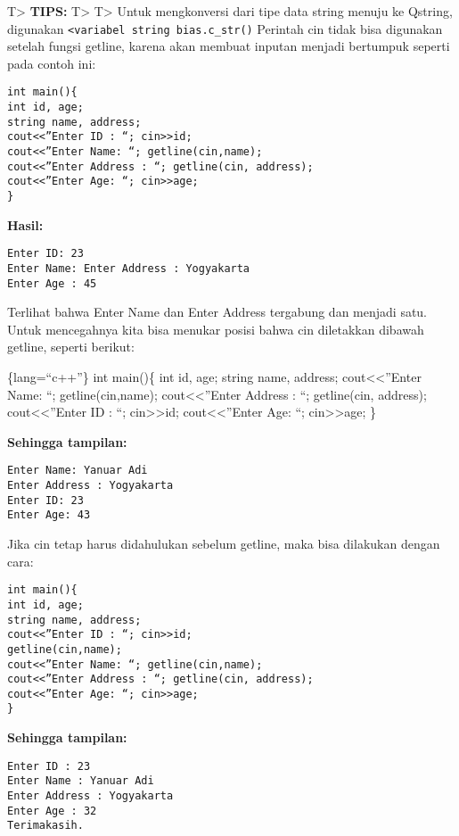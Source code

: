 T\textgreater{} \textbf{TIPS:} T\textgreater{} T\textgreater{} Untuk
mengkonversi dari tipe data string menuju ke Qstring, digunakan
\texttt{\textless{}variabel\ string\ bias.c\_str()} Perintah cin tidak
bisa digunakan setelah fungsi getline, karena akan membuat inputan
menjadi bertumpuk seperti pada contoh ini:

\begin{verbatim}
int main(){
int id, age;
string name, address;
cout<<”Enter ID : “; cin>>id;
cout<<”Enter Name: “; getline(cin,name);
cout<<”Enter Address : “; getline(cin, address);
cout<<”Enter Age: “; cin>>age;
}
\end{verbatim}

\textbf{Hasil:}

\begin{verbatim}
Enter ID: 23
Enter Name: Enter Address : Yogyakarta
Enter Age : 45
\end{verbatim}

Terlihat bahwa Enter Name dan Enter Address tergabung dan menjadi satu.
Untuk mencegahnya kita bisa menukar posisi bahwa cin diletakkan dibawah
getline, seperti berikut:

\{lang=``c++''\} int main()\{ int id, age; string name, address;
cout\textless{}\textless{}''Enter Name: ``; getline(cin,name);
cout\textless{}\textless{}''Enter Address : ``; getline(cin, address);
cout\textless{}\textless{}''Enter ID : ``;
cin\textgreater{}\textgreater{}id; cout\textless{}\textless{}''Enter
Age: ``; cin\textgreater{}\textgreater{}age; \}

\textbf{Sehingga tampilan:}

\begin{verbatim}
Enter Name: Yanuar Adi
Enter Address : Yogyakarta
Enter ID: 23
Enter Age: 43
\end{verbatim}

Jika cin tetap harus didahulukan sebelum getline, maka bisa dilakukan
dengan cara:

\begin{verbatim}
int main(){
int id, age;
string name, address;
cout<<”Enter ID : “; cin>>id;
getline(cin,name);
cout<<”Enter Name: “; getline(cin,name);
cout<<”Enter Address : “; getline(cin, address);
cout<<”Enter Age: “; cin>>age;
}
\end{verbatim}

\textbf{Sehingga tampilan:}

\begin{verbatim}
Enter ID : 23
Enter Name : Yanuar Adi
Enter Address : Yogyakarta
Enter Age : 32
Terimakasih.
\end{verbatim}
